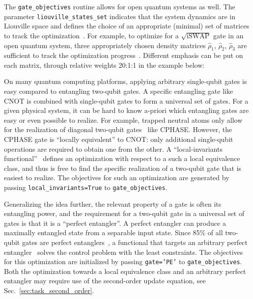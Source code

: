 \documentclass[submission, Phys]{SciPost}
\newcommand{\Op}[1]{\hat{#1}}
\begin{document}
The \texttt{gate\_objectives} routine allows for open quantum systems as well.
The parameter \texttt{liouville\_states\_set} indicates that the system dynamics
are in Liouville space and defines the choice of an appropriate (minimal) set of
matrices to track the optimization~\cite{GoerzNJP2014}.
For example, to optimize for a $\sqrt{\text{iSWAP}}$ gate in an open quantum
system, three appropriately chosen density matrices $\Op{\rho}_1$,
$\Op{\rho}_2$, $\Op{\rho}_3$ are sufficient to track the optimization
progress~\cite{GoerzNJP2014}.
Different emphasis can be put on each matrix, through relative weights 20:1:1 in
the example below:


On many quantum computing platforms, applying arbitrary single-qubit gates is
easy compared to entangling two-qubit gates.
A specific entangling gate like CNOT is combined with single-qubit gates to form
a universal set of gates.
For a given physical system, it can be hard to know a-priori which entangling
gates are easy or even possible to realize.
For example, trapped neutral atoms only allow for the realization of diagonal
two-qubit gates~\cite{JakschPRL2000,GoerzNJP2014} like CPHASE\@.
However, the CPHASE gate is ``locally equivalent'' to CNOT\@: only additional
single-qubit operations are required to obtain one from the other.
A ``local-invariants functional''~\cite{MullerPRA11} defines an optimization
with respect to a such a local equivalence class, and thus is free to find the
specific realization of a two-qubit gate that is easiest to realize.
The objectives for such an optimization are generated by passing
\texttt{local\_invariants=True} to \texttt{gate\_objectives}.

Generalizing the idea further, the relevant property of a gate is often its
entangling power, and the requirement for a two-qubit gate in a universal set of
gates is that it is a ``perfect entangler''.
A perfect entangler can produce a maximally entangled state from a separable
input state.
Since 85\% of all two-qubit gates are perfect
entanglers~\cite{WattsE2013,MuszPRA2013}, a functional that targets an arbitrary
perfect entangler~\cite{WattsPRA2015,GoerzPRA2015} solves the control problem
with the least constraints.
The objectives for this optimization are initialized by passing
\texttt{gate='PE'} to \texttt{gate\_objectives}.
Both the optimization towards a local equivalence class and an arbitrary perfect
entangler may require use of the second-order update equation, see
Sec.~\ref{sec:task_second_order}.
\end{document}

